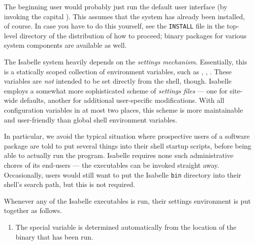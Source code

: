 \begin{isabellebody}
\begin{isamarkuptext}
\begin{itemize}
  \end{itemize}

  \medskip The beginning user would probably just run the default user
  interface (by invoking the capital \hyperlink{executable.Isabelle}{\mbox{}}).  This
  assumes that the system has already been installed, of course.  In
  case you have to do this yourself, see the \verb|INSTALL| file
  in the top-level directory of the distribution of how to proceed;
  binary packages for various system components are available as well.%
\end{isamarkuptext}%
\isamarkuptrue%
%
\isamarkuptrue%
%
\begin{isamarkuptext}%
The Isabelle system heavily depends on the \emph{settings
  mechanism}.  Essentially, this is a statically
  scoped collection of environment variables, such as \hyperlink{setting.ISABELLE-HOME}{\mbox{}}, \hyperlink{setting.ML-SYSTEM}{\mbox{}}, \hyperlink{setting.ML-HOME}{\mbox{}}.  These
  variables are \emph{not} intended to be set directly from the shell,
  though.  Isabelle employs a somewhat more sophisticated scheme of
  \emph{settings files} --- one for site-wide defaults, another for
  additional user-specific modifications.  With all configuration
  variables in at most two places, this scheme is more maintainable
  and user-friendly than global shell environment variables.

  In particular, we avoid the typical situation where prospective
  users of a software package are told to put several things into
  their shell startup scripts, before being able to actually run the
  program. Isabelle requires none such administrative chores of its
  end-users --- the executables can be invoked straight away.
  Occasionally, users would still want to put the Isabelle \verb|bin| directory into their shell's search path, but this is not
  required.%
\end{isamarkuptext}%
\isamarkuptrue%
%
\isamarkuptrue%
%
\begin{isamarkuptext}%
Whenever any of the Isabelle executables is run, their settings
  environment is put together as follows.

  \begin{enumerate}

  \item The special variable \hypertarget{setting.ISABELLE-HOME}{\hyperlink{setting.ISABELLE-HOME}{\mbox{}}} is
  determined automatically from the location of the binary that has
  been run.
  

\end{enumerate}
\end{isamarkuptext}
\end{isabellebody}
